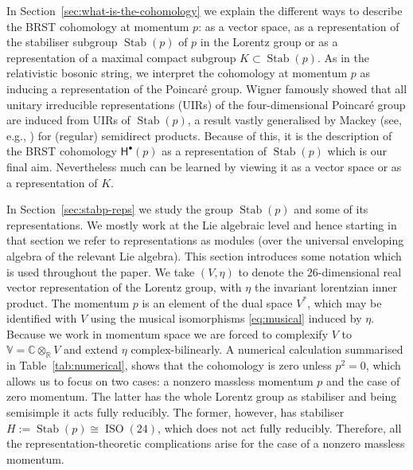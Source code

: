 \documentclass[11pt,reqno,a4paper,final]{amsart}
\theoremstyle{plain}
\theoremstyle{definition}
\newcommand{\sH}{\mathsf{H}}
\newcommand{\Stab}{\operatorname{Stab}}
\newcommand{\VV}{\mathbb{V}}
\newcommand{\RR}{\mathbb{R}}
\newcommand{\CC}{\mathbb{C}}
\newcommand{\1}{\mathbb{1}}
\newcommand{\ISO}{\operatorname{ISO}}
\numberwithin{equation}{section}
\begin{document}
In Section~\ref{sec:what-is-the-cohomology} we explain the different
ways to describe the BRST cohomology at momentum $p$: as a vector
space, as a representation of the stabiliser subgroup $\Stab(p)$ of
$p$ in the Lorentz group or as a representation of a maximal compact
subgroup $K \subset \Stab(p)$. As in the relativistic bosonic string,
we interpret the cohomology at momentum $p$ as inducing a
representation of the Poincaré group.  Wigner \cite{MR1503456}
famously showed that all unitary irreducible representations
(UIRs) of the four-dimensional Poincaré group are induced from UIRs of
$\Stab(p)$, a result vastly generalised by Mackey (see, e.g.,
\cite{MR0396826}) for (regular) semidirect products.  Because of this,
it is the description of the BRST cohomology $\sH^\bullet(p)$ as a
representation of $\Stab(p)$ which is our final aim. Nevertheless much
can be learned by viewing it as a vector space or as a representation
of $K$.

In Section~\ref{sec:stabp-reps} we study the group $\Stab(p)$ and some
of its representations.  We mostly work at the Lie algebraic level and
hence starting in that section we refer to representations as modules
(over the universal enveloping algebra of the relevant Lie algebra).
This section introduces some notation which is used throughout the
paper.  We take $(V,\eta)$ to denote the $26$-dimensional real vector
representation of the Lorentz group, with $\eta$ the invariant
lorentzian inner product.  The momentum $p$ is an element of the dual
space $V^*$, which may be identified with $V$ using the musical
isomorphisms \eqref{eq:musical} induced by $\eta$.  Because we work in
momentum space we are forced to complexify $V$ to
$\VV = \CC \otimes_\RR V$ and extend $\eta$ complex-bilinearly.  A
numerical calculation summarised in Table~\ref{tab:numerical}, shows
that the cohomology is zero unless $p^2 = 0$, which allows us to focus
on two cases: a nonzero massless momentum $p$ and the case of zero
momentum.  The latter has the whole Lorentz group as stabiliser and
being semisimple it acts fully reducibly.  The former, however, has 
stabiliser $H := \Stab(p) \cong \ISO(24)$, which does not act fully
reducibly.  Therefore,  all the representation-theoretic complications
arise for the case of a nonzero massless momentum.
\end{document}
